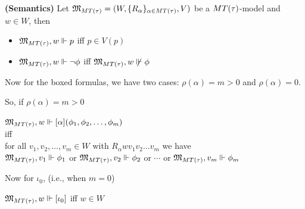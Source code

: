 \begin{definition}\label{satisfiability clauses - pure}

    \textbf{(Semantics)} Let $\mathfrak{M}_{MT(\tau)} = (W,\{ R_{\alpha} \}_{\alpha \in MT(\tau)},V)$ be a $MT(\tau)$-model and $w\in W$, then

    \begin{itemize}

        \item $\mathfrak{M}_{MT(\tau)} , w \Vdash p$ \quad iff \quad $p\in V(p)$

        \item $\mathfrak{M}_{MT(\tau)} , w \Vdash \neg\phi$ \quad iff \quad $\mathfrak{M}_{MT(\tau)} , w \not\Vdash \phi$

    \end{itemize}    

    \par Now for the boxed formulas, we have two cases: $\rho(\alpha)=m > 0$ and $\rho(\alpha) = 0$.

    \par So, if $\rho(\alpha)=m > 0$

    \begin{center}

        $\mathfrak{M}_{MT(\tau)},  w \Vdash [\alpha](\phi_1,\phi_2,\ldots,\phi_m)$\\

        iff\\

        for all $v_1,v_2, \ldots, v_m \in W$ with $R_{\alpha}wv_1v_2\ldots v_m$ we have\\

        $\mathfrak{M}_{MT(\tau)}, v_1\Vdash\phi_1$ or $\mathfrak{M}_{MT(\tau)}, v_2\Vdash\phi_2$ or $\cdots$ or $\mathfrak{M}_{MT(\tau)}, v_m\Vdash\phi_m$

    \end{center}







\par Now for $\iota_0$, (i.e., when $m=0$)

    \begin{center}

        $\mathfrak{M}_{MT(\tau)},  w \Vdash [\iota_0]$ \quad iff \quad $w\in W$

    \end{center}








\end{definition}
